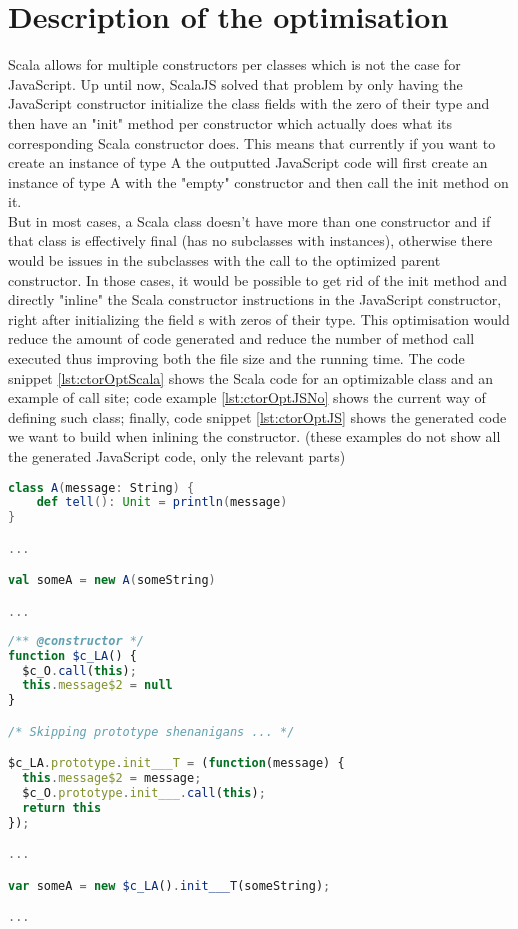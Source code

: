 \section{Description of the optimisation}
Scala allows for multiple constructors per classes which is not the case for JavaScript. Up until now, ScalaJS solved that problem by only having the JavaScript constructor initialize the class fields with the zero of their type and then have an "init" method per constructor which actually does what its corresponding Scala constructor does. This means that currently if you want to create an instance of type A the outputted JavaScript code will first create an instance of type A with the "empty" constructor and then call the init method on it. \\
But in most cases, a Scala class doesn't have more than one constructor and if that class is effectively final (has no subclasses with instances), otherwise there would be issues in the subclasses with the call to the optimized parent constructor. In those cases, it would be possible to get rid of the init method and directly "inline" the Scala constructor instructions in the JavaScript constructor, right after initializing the field s with zeros of their type. This optimisation would reduce the amount of code generated and reduce the number of method call executed thus improving both the file size and the running time. The code snippet \ref{lst:ctorOptScala} shows the Scala code for an optimizable class and an example of call site; code example \ref{lst:ctorOptJSNo} shows the current way of defining such class; finally, code snippet \ref{lst:ctorOptJS} shows the generated code we want to build when inlining the constructor. (these examples do not show all the generated JavaScript code, only the relevant parts)
\begin{lstlisting}[language=scala,caption=Example Scala Code., label={lst:ctorOptScala}]
class A(message: String) {
    def tell(): Unit = println(message)
}

...

val someA = new A(someString)

...

\end{lstlisting}
\begin{lstlisting}[language=javascript,caption=Generated JavaScript without optimisation., label={lst:ctorOptJSNo}]
/** @constructor */
function $c_LA() {
  $c_O.call(this);
  this.message$2 = null
}

/* Skipping prototype shenanigans ... */

$c_LA.prototype.init___T = (function(message) {
  this.message$2 = message;
  $c_O.prototype.init___.call(this);
  return this
});

...

var someA = new $c_LA().init___T(someString);

...

\end{lstlisting}

